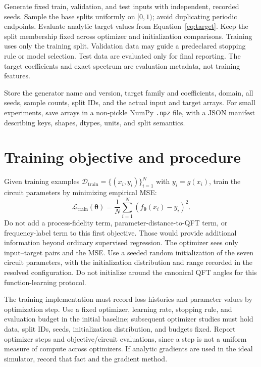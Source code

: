 \documentclass[11pt]{article}
\begin{document}
Generate fixed train, validation, and test inputs with independent, recorded seeds. Sample the base splits uniformly on $[0,1)$; avoid duplicating periodic endpoints. Evaluate analytic target values from Equation~\eqref{eq:target}. Keep the split membership fixed across optimizer and initialization comparisons. Training uses only the training split. Validation data may guide a predeclared stopping rule or model selection. Test data are evaluated only for final reporting. The target coefficients and exact spectrum are evaluation metadata, not training features.

Store the generator name and version, target family and coefficients, domain, all seeds, sample counts, split IDs, and the actual input and target arrays. For small experiments, save arrays in a non-pickle NumPy \texttt{.npz} file, with a JSON manifest describing keys, shapes, dtypes, units, and split semantics.

\section{Training objective and procedure}

Given training examples $\mathcal{D}_{\mathrm{train}}=\{(x_i,y_i)\}_{i=1}^{N}$ with $y_i=g(x_i)$, train the circuit parameters by minimizing empirical MSE:
\begin{equation}
  \mathcal{L}_{\mathrm{train}}(\boldsymbol{\theta})
  = \frac{1}{N}\sum_{i=1}^N
    \left(f_{\boldsymbol{\theta}}(x_i)-y_i\right)^2.
  \label{eq:mse}
\end{equation}
Do not add a process-fidelity term, parameter-distance-to-QFT term, or frequency-label term to this first objective. Those would provide additional information beyond ordinary supervised regression. The optimizer sees only input--target pairs and the MSE. Use a seeded random initialization of the seven circuit parameters, with the initialization distribution and range recorded in the resolved configuration. Do not initialize around the canonical QFT angles for this function-learning protocol.

The training implementation must record loss histories and parameter values by optimization step. Use a fixed optimizer, learning rate, stopping rule, and evaluation budget in the initial baseline; subsequent optimizer studies must hold data, split IDs, seeds, initialization distribution, and budgets fixed. Report optimizer steps and objective/circuit evaluations, since a step is not a uniform measure of compute across optimizers. If analytic gradients are used in the ideal simulator, record that fact and the gradient method.
\end{document}
